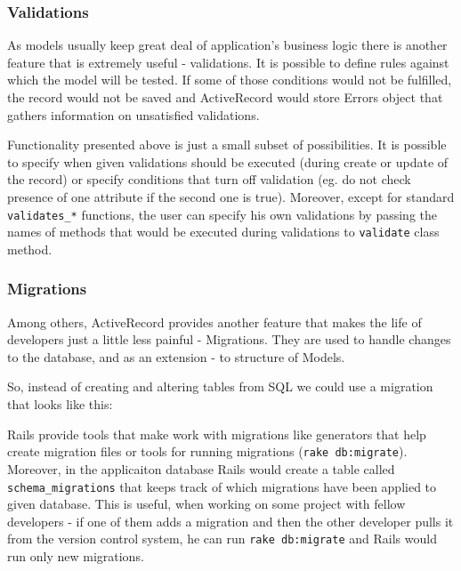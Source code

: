       

      \subsubsection{Validations}
      As models usually keep great deal of application's business logic there is another feature
      that is extremely useful - validations. It is possible to define rules against which the 
      model will be tested. If some of those conditions would not be fulfilled, the record would
      not be saved and ActiveRecord would store Errors object that gathers information on 
      unsatisfied validations.
      
      
      
      Functionality presented above is just a small subset of possibilities. It is possible
      to specify when given validations should be executed (during create or update of the record)
      or specify conditions that turn off validation (eg. do not check presence of one attribute
      if the second one is true). Moreover, except for standard \texttt{validates\_*} functions,
      the user can specify his own validations by passing the names of methods that would be  
      executed during validations to \texttt{validate} class method.
      
      \subsubsection{Migrations}
      Among others, ActiveRecord provides another feature that makes the life of developers
      just a little less painful - Migrations. They are used to handle changes to the database,
      and as an extension - to structure of Models. 
      
      So, instead of creating and altering tables from SQL we could use a migration that looks
      like this:
      
      
      
      Rails provide tools that make work with migrations like generators that help create migration
      files or tools for running migrations (\texttt{rake db:migrate}). Moreover, in the applicaiton
      database Rails would create a table called \texttt{schema\_migrations} that keeps track of 
      which migrations have been applied to given database. This is useful, when working on some
      project with fellow developers - if one of them adds a migration and then the other developer
      pulls it from the version control system, he can run \texttt{rake db:migrate} and Rails
      would run only new migrations.

